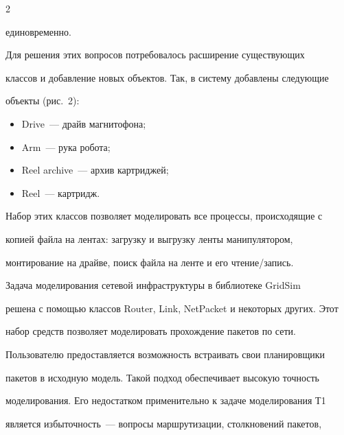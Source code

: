 \begin{multicols}{2}
\begin{itemize}
единовременно. 


\end{itemize}


   


   Для решения этих вопросов потребовалось расширение существующих 


классов и добавление новых объектов. Так, в сис\-те\-му добавлены следующие 


объекты (рис.~2):


   \begin{itemize}


\item Drive~--- драйв магнитофона;


\item Arm~--- рука робота;


\item Reel archive~--- архив картриджей;


\item Reel~--- картридж.


\end{itemize}














   Набор этих классов позволяет моделировать все процессы, происходящие с 


копией файла на лентах: загрузку и выгрузку ленты манипулятором, 


монтирование на драйве, поиск файла на ленте и его чте\-ние/за\-пись.


   


   Задача моделирования сетевой инфраструктуры в библиотеке GridSim 


решена с помощью классов Router, Link, NetPacket и некоторых других. Этот 


набор средств позволяет моделировать прохождение пакетов по сети. 


Пользователю предоставляется возможность встраивать свои планировщики 


пакетов в исходную модель. Такой подход обеспечивает высокую точность 


моделирования. Его недостатком применительно к задаче моделирования Т1 


является избыточность~--- вопросы маршрутизации, столкновений пакетов, 



\end{multicols}

